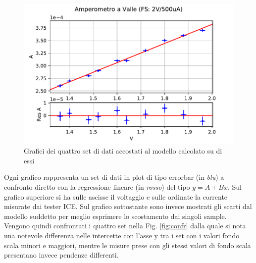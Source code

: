 \documentclass{article}
\begin{document}
\begin{figure}[t]
\begin{minipage}{0.5\textwidth}
    \end{minipage}\hfill
    \begin{minipage}{0.5\textwidth}
        \centering
        \includegraphics[width=\textwidth]{data/AmpVal2V500uA.pdf} 
    \end{minipage}
    \caption{Grafici dei quattro set di dati accostati al modello calcolato su di essi}
    \label{fig:quattro}
\end{figure}

Ogni grafico rappresenta un set di dati in plot di tipo errorbar (in \textit{blu}) a confronto diretto con la regressione lineare (in \textit{rosso}) del tipo $y=A+Bx$. Sul grafico superiore si ha sulle ascisse il voltaggio e sulle ordinate la corrente misurate dai tester ICE. Sul grafico sottostante sono invece mostrati gli scarti dal modello suddetto per meglio esprimere lo scostamento dai singoli sample.\\
Vengono quindi confrontati i quattro set nella Fig. \ref{fig:confr} dalla quale si nota una notevole differenza nelle intercette con l'asse y tra i set con i valori fondo scala minori e maggiori, mentre le misure prese con gli stessi valori di fondo scala presentano invece pendenze differenti.
\end{document}
